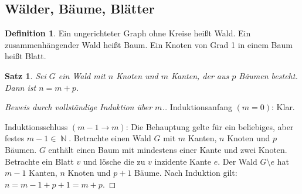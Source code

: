 \documentclass[a4paper,12pt]{article}
\DeclareMathOperator{\N}{\mathbb N}
\newtheorem{satz}[axiom]{Satz}
\theoremstyle{definition}
\newtheorem{definition}[axiom]{Definition}
\begin{document}
	\setcounter{section}{6}
	\setcounter{subsection}{6}
	\subsection{Wälder, Bäume, Blätter}
	\begin{definition}
		Ein ungerichteter Graph ohne Kreise heißt Wald. Ein zusammenhängender Wald heißt Baum. Ein Knoten von Grad 1 in einem Baum heißt Blatt.
	\end{definition}
	\begin{satz}
		Sei $G$ ein Wald mit $n$ Knoten und $m$ Kanten, der aus $p$ Bäumen besteht. Dann ist $n = m + p$.
	\end{satz}
	\begin{proof}[Beweis durch vollständige Induktion über $m$.]
		Induktionsanfang $(m = 0)$: Klar.
		
		Induktionsschluss $(m - 1 \to m)$:
		Die Behauptung gelte für ein beliebiges, aber festes $m - 1 \in \N$. Betrachte einen Wald $G$ mit $m$ Kanten, $n$ Knoten und $p$ Bäumen. $G$ enthält einen Baum mit mindestens einer Kante und zwei Knoten. Betrachte ein Blatt $v$ und lösche die zu $v$ inzidente Kante $e$. Der Wald $G\setminus e$ hat $m - 1$ Kanten, $n$ Knoten und $p + 1$ Bäume. Nach Induktion gilt: $n = m - 1 + p + 1 = m + p$.
	\end{proof}
\end{document}
